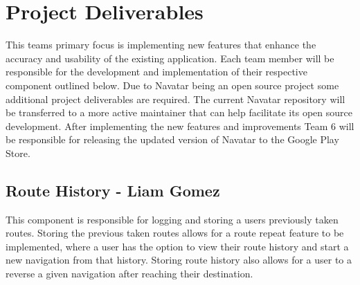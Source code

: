 \documentclass{scrreprt}
\begin{document}
\chapter{Project Deliverables}
This team\textsc{}s primary focus is implementing new features that enhance the accuracy and usability of the existing application. Each team member will be responsible for the development and implementation of their respective component outlined below. Due to Navatar being an open source project some additional project deliverables are required. The current Navatar repository will be transferred to a more active maintainer that can help facilitate its open source development. After implementing the new features and improvements Team 6 will be responsible for releasing the updated version of Navatar to the Google Play Store.


\section{Route History - Liam Gomez}
This component is responsible for logging and storing a user\textsc{}s previously taken routes. Storing the previous taken routes allows for a route repeat feature to be implemented, where a user has the option to view their route history and start a new navigation from that history. Storing route history also allows for a user to a reverse a given navigation after reaching their destination.
\end{document}
